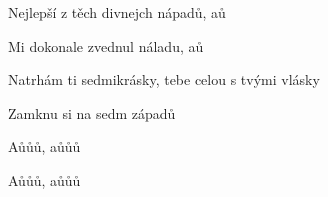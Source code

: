 \begin{song}
\bigskip

\Refren

\bigskip

Nejlepší z těch divnejch nápadů, aů \par
Mi dokonale zvednul náladu, aů \par
{}Natrhám ti sedmikrásky, tebe celou s tvými vlásky \par
{}Zamknu si na sedm západů \par

\bigskip

Aůůů, aůůů \par
Aůůů, aůůů \par

\end{song}
